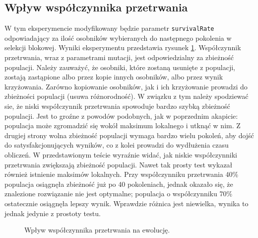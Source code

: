 \documentclass[a4paper,12pt,leqno]{article}
\begin{document}
\subsection{Wpływ współczynnika przetrwania}
W tym eksperymencie modyfikowany będzie parametr \texttt{survivalRate} odpowiadający za ilość osobników wybieranych do następnego pokolenia w
selekcji blokowej. Wyniki eksperymentu przedstawia rysunek \ref{surv}. Współczynnik przetrwania, wraz z parametrami mutacji, jest odpowiedzialny
za zbieżność populacji. Należy zauważyć, że osobniki, które zostaną usunięte z populacji, zostają zastąpione albo przez kopie innych osobników,
albo przez wynik krzyżowania. Zarówno kopiowanie osobników, jak i ich krzyżowanie prowadzi do zbieżności populacji (usuwa różnorodność). W związku
z tym należy spodziewać sie, że niski współczynnik przetrwania spowoduje bardzo szybką zbieżność populacji. Jest to groźne z powodów podobnych,
jak w poprzednim akapicie: populacja może zgromadzić się wokół maksimum lokalnego i utknąć w nim. Z drugiej strony wolna zbieżność populacji
wymaga bardzo wielu pokoleń, aby dojść do satysfakcjonujących wyników, co z kolei prowadzi do wydłużenia czasu obliczeń. W przedstawionym teście
wyraźnie widać, jak niskie współczynniki przetrwania zwiększają zbieżność populacji. Nawet tak prosty test wykazał również istnienie maksimów
lokalnych. Przy współczynniku przetrwania 40\% populacja osiągnęła zbieżność już po 40 pokoleniach, jednak okazało się, że znalezione rozwiązanie
nie jest optymalne; populacja o współczynniku 70\% ostatecznie osiągnęła lepszy wynik. Wprawdzie różnica jest niewielka, wynika to jednak jedynie
z prostoty testu.

\begin{figure}\centering
\footnotesize\vspace{-2em}
\normalsize\caption{Wpływ współczynnika przetrwania na ewolucję.}\label{surv}
\end{figure}
\end{document}
